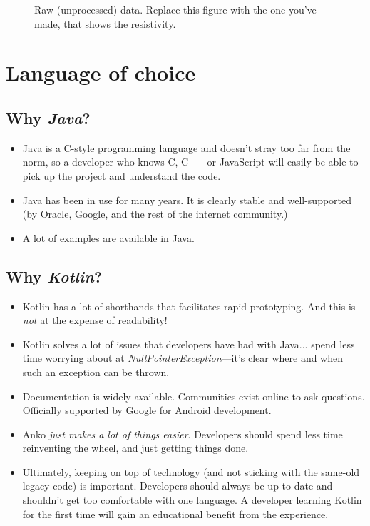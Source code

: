 \documentclass[a4paper]{article}
\begin{document}
\begin{figure}
    \centering
    \caption{\label{fig:data}Raw (unprocessed) data. Replace this figure with the one you've made, that shows the resistivity.}
\end{figure}
\pagebreak

\section{Language of choice}
\label{sec:language}


\subsection{Why \emph{Java}?}
\begin{itemize}
    \item Java is a C-style programming language and doesn't stray too far from the norm, so a developer who knows C, C++ or JavaScript will easily be able to pick up the project and understand the code.
    \item Java has been in use for many years. It is clearly stable and well-supported (by Oracle, Google, and the rest of the internet community.)
    \item A lot of examples are available in Java.
\end{itemize}

\subsection{Why \emph{Kotlin}?}
\begin{itemize}
    \item Kotlin has a lot of shorthands that facilitates rapid prototyping. And this is \emph{not} at the expense of readability!\cite{whykotlin}
    \item Kotlin solves a lot of issues that developers have had with Java... spend less time worrying about at \emph{NullPointerException}---it's clear where and when such an exception can be thrown.
    \item Documentation is widely available. Communities exist online\cite{kotlincommunity} to ask questions. Officially supported by Google for Android development.
    \item Anko \emph{just makes a lot of things easier}. Developers should spend less time reinventing the wheel, and just getting things done.
    \item Ultimately, keeping on top of technology (and not sticking with the same-old legacy code) is important. Developers should always be up to date and shouldn't get too comfortable with one language. A developer learning Kotlin for the first time will gain an educational benefit from the experience.
\end{itemize}
\end{document}
